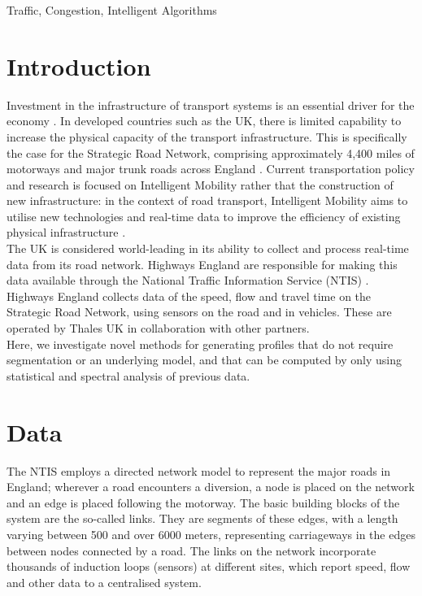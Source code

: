 \documentclass[conference]{IEEEtran}
\begin{document}
\begin{IEEEkeywords}
Traffic, Congestion, Intelligent Algorithms
\end{IEEEkeywords}

\section{Introduction}
Investment in the infrastructure of transport systems is an essential driver for the economy \cite{government}. 
In developed countries such as the UK, there is limited capability to increase the physical capacity of the transport infrastructure. 
This is specifically the case for the Strategic Road Network, comprising approximately 4,400 miles of motorways and major trunk roads across England \cite{Strategic}. 
Current transportation policy and research is focused on Intelligent Mobility rather that the construction of new infrastructure: in the context of road transport, Intelligent Mobility aims to utilise new technologies and real-time data to improve the efficiency of existing physical infrastructure \cite{needs}.\\

The UK is considered world-leading in its ability to collect and process real-time data from its road network. 
Highways England are responsible for making this data available through the National Traffic Information Service (NTIS) \cite{NTIS}. 
Highways England collects data of the speed, flow and travel time on the Strategic Road Network, using sensors on the road and in vehicles. 
These are operated by Thales UK in collaboration with other partners.\\

Here, we investigate novel methods for generating profiles that do not require segmentation or an underlying model, and that can be computed by only using statistical and spectral analysis of previous data.

\section{Data}
The NTIS employs a directed network model to represent the major roads in England; wherever a road encounters a diversion, a node is placed on the network and an edge is placed following the motorway.
The basic building blocks of the system are the so-called links. 
They are segments of these edges, with a length varying between 500 and over 6000 meters, representing carriageways in the edges between nodes connected by a road. 
The links on the network incorporate thousands of induction loops (sensors) at different sites, which report speed, flow and other data to a centralised system.\\
\end{document}
